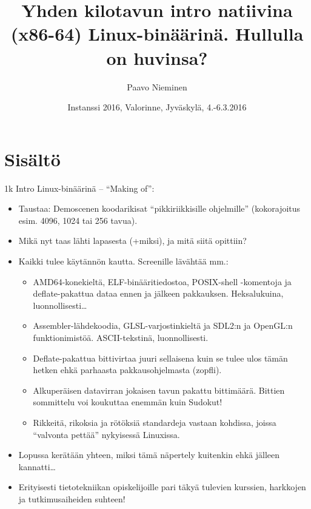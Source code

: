 \documentclass[pdf,10pt,handout]{beamer}
\title[Linux 1k intro -- ``making of'']
{Yhden kilotavun intro natiivina (x86-64) Linux-binäärinä. Hullulla on huvinsa?}
\author{Paavo Nieminen}
\date{Instanssi 2016, Valorinne, Jyväskylä, 4.-6.3.2016}
\begin{document}
\begin{frame}
  \titlepage
\end{frame}

\beamerdefaultoverlayspecification{<+->}

\section{Sisältö}
\begin{frame}{1k Intro Linux-binäärinä -- ``Making of'':}
  \begin{itemize}
  \item Taustaa: Demoscenen koodarikisat ``pikkiriikkisille
    ohjelmille'' (kokorajoitus esim. 4096, 1024 tai 256 tavua).
  \item Mikä nyt taas lähti lapasesta (+miksi), ja mitä siitä opittiin?
  \item Kaikki tulee käytännön kautta. Screenille lävähtää mm.:
    \begin{itemize}
    \item AMD64-konekieltä, ELF-binääritiedostoa, POSIX-shell
      -komentoja ja deflate-pakattua dataa ennen ja jälkeen
      pakkauksen. Heksalukuina, luonnollisesti\ldots
    \item Assembler-lähdekoodia, GLSL-varjostinkieltä ja SDL2:n ja
      OpenGL:n funktionimistöä. ASCII-tekstinä, luonnollisesti.
    \item Deflate-pakattua bittivirtaa juuri sellaisena kuin se tulee
      ulos tämän hetken ehkä parhaasta pakkausohjelmasta (zopfli).
    \item Alkuperäisen datavirran jokaisen tavun pakattu bittimäärä.
      Bittien sommittelu voi koukuttaa enemmän kuin Sudokut!
    \item Rikkeitä, rikoksia ja rötöksiä standardeja vastaan kohdissa,
      joissa ``valvonta pettää'' nykyisessä Linuxissa.
    \end{itemize}
  \item Lopussa kerätään yhteen, miksi tämä näpertely kuitenkin ehkä
    jälleen kannatti\ldots
  \item Erityisesti tietotekniikan opiskelijoille pari täkyä tulevien
    kurssien, harkkojen ja tutkimusaiheiden suhteen!
  \end{itemize}
\end{frame}
\end{document}
